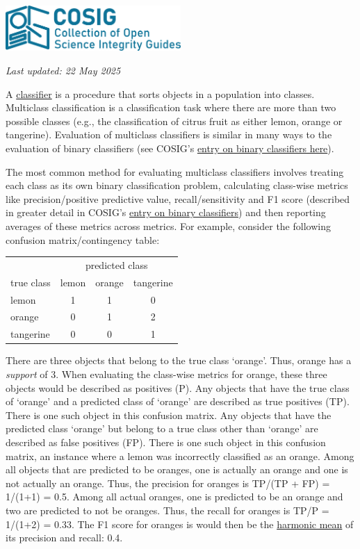 \documentclass[letterpaper, 12pt]{article}
\begin{document}
\flushleft\includegraphics[width=0.5\textwidth]{img/home/241017_final_logo_mockup.png}

\textit{Last updated: 22 May 2025}

A \href{https://en.wikipedia.org/wiki/Classification_rule}{classifier} is a procedure that sorts objects in a population into classes. Multiclass classification is a classification task where there are more than two possible classes (e.g., the classification of citrus fruit as either lemon, orange or tangerine). Evaluation of multiclass classifiers is similar in many ways to the evaluation of binary classifiers (see COSIG's \href{https://osf.io/pvr4a}{entry on binary classifiers here}).

The most common method for evaluating multiclass classifiers involves treating each class as its own binary classification problem, calculating class-wise metrics like precision/positive predictive value, recall/sensitivity and F1 score (described in greater detail in COSIG's \href{https://osf.io/pvr4a}{entry on binary classifiers}) and then reporting averages of these metrics across metrics. For example, consider the following confusion matrix/contingency table:

\begin{center}
\begin{tabular}{l|ccc}
& \multicolumn{3}{c}{predicted class} \\
true class & lemon & orange & tangerine \\
\hline
lemon & 1 & 1 & 0\\
orange & 0 & 1 & 2\\
tangerine & 0 & 0 & 1\\
\end{tabular}
\end{center}

There are three objects that belong to the true class `orange'. Thus, orange has a \emph{support} of 3. When evaluating the class-wise metrics for orange, these three objects would be described as positives (P). Any objects that have the true class of `orange' and a predicted class of `orange' are described as true positives (TP). There is one such object in this confusion matrix. Any objects that have the predicted class `orange' but belong to a true class other than `orange' are described as false positives (FP). There is one such object in this confusion matrix, an instance where a lemon was incorrectly classified as an orange. Among all objects that are predicted to be oranges, one is actually an orange and one is not actually an orange. Thus, the precision for oranges is TP/(TP + FP) = 1/(1+1) = 0.5. Among all actual oranges, one is predicted to be an orange and two are predicted to not be oranges. Thus, the recall for oranges is TP/P = 1/(1+2) = 0.33. The F1 score for oranges is would then be the \href{https://en.wikipedia.org/wiki/Harmonic_mean}{harmonic mean} of its precision and recall: 0.4.
\end{document}
